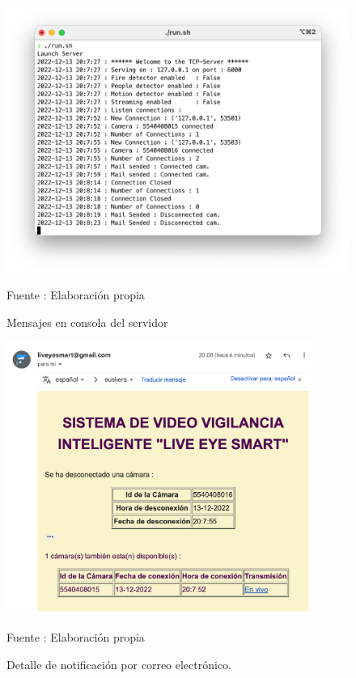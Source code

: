 \begin{figure}[H]
    \begin{center}
        \includegraphics[width=12cm]{img/capitulo_6/cam_disconnected_n_cams.png}
    \end{center}
    \begin{center}
        \caption{Mensajes en consola del servidor}
        Fuente : Elaboración propia
    \end{center}
\end{figure}

\begin{figure}[H]
    \begin{center}
        \includegraphics[width=10cm]{img/capitulo_6/mail3.png}
    \end{center}
    \begin{center}
        \caption{Detalle de notificación por correo electrónico.}
        Fuente : Elaboración propia
    \end{center}
\end{figure}

